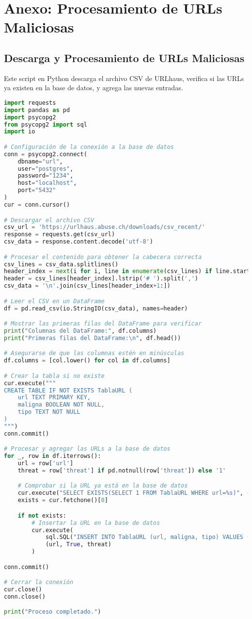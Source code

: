 

\section*{Anexo: Procesamiento de URLs Maliciosas}

\subsection*{Descarga y Procesamiento de URLs Maliciosas}

Este script en Python descarga el archivo CSV de URLhaus, verifica si las URLs ya existen en la base de datos, y agrega las nuevas entradas.

\begin{lstlisting}[language=Python, caption=Script para procesar URLs maliciosas]
import requests
import pandas as pd
import psycopg2
from psycopg2 import sql
import io

# Configuración de la conexión a la base de datos
conn = psycopg2.connect(
    dbname="url",
    user="postgres",
    password="1234",
    host="localhost",
    port="5432"
)
cur = conn.cursor()

# Descargar el archivo CSV
csv_url = 'https://urlhaus.abuse.ch/downloads/csv_recent/'
response = requests.get(csv_url)
csv_data = response.content.decode('utf-8')

# Procesar el contenido para obtener la cabecera correcta
csv_lines = csv_data.splitlines()
header_index = next(i for i, line in enumerate(csv_lines) if line.startswith('# id'))
header = csv_lines[header_index].lstrip('# ').split(',')
csv_data = '\n'.join(csv_lines[header_index+1:])

# Leer el CSV en un DataFrame
df = pd.read_csv(io.StringIO(csv_data), names=header)

# Mostrar las primeras filas del DataFrame para verificar
print("Columnas del DataFrame:", df.columns)
print("Primeras filas del DataFrame:\n", df.head())

# Asegurarse de que las columnas estén en minúsculas
df.columns = [col.lower() for col in df.columns]

# Crear la tabla si no existe
cur.execute("""
CREATE TABLE IF NOT EXISTS TablaURL (
    url TEXT PRIMARY KEY,
    maligna BOOLEAN NOT NULL,
    tipo TEXT NOT NULL
)
""")
conn.commit()

# Procesar y agregar las URLs a la base de datos
for _, row in df.iterrows():
    url = row['url']
    threat = row['threat'] if pd.notnull(row['threat']) else '1'

    # Comprobar si la URL ya está en la base de datos
    cur.execute("SELECT EXISTS(SELECT 1 FROM TablaURL WHERE url=%s)", (url,))
    exists = cur.fetchone()[0]

    if not exists:
        # Insertar la URL en la base de datos
        cur.execute(
            sql.SQL("INSERT INTO TablaURL (url, maligna, tipo) VALUES (%s, %s, %s)"),
            (url, True, threat)
        )

conn.commit()

# Cerrar la conexión
cur.close()
conn.close()

print("Proceso completado.")
\end{lstlisting}

